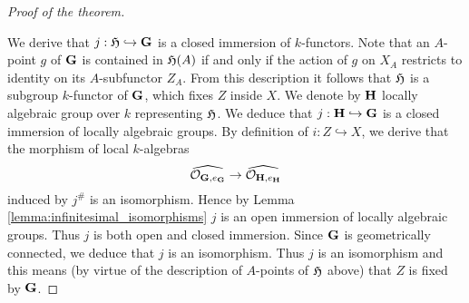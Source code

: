 \begin{proof}[Proof of the theorem]
\begin{center}
\end{center}
We derive that $j:{\mathfrak H} \hookrightarrow \mathbf{G}$ is a closed immersion of $k$-functors. Note that an $A$-point $g$ of $\mathbf{G}$ is contained in ${\mathfrak H}(A)$ if and only if the action of $g$ on $X_A$ restricts to identity on its $A$-subfunctor $Z_A$. From this description it follows that ${\mathfrak H}$ is a subgroup $k$-functor of $\mathbf{G}$, which fixes $Z$ inside $X$. We denote by $\mathbf{H}$ locally algebraic group over $k$ representing ${\mathfrak H}$. We deduce that $j:\mathbf{H}\hookrightarrow \mathbf{G}$ is a closed immersion of locally algebraic groups. By definition of $i:Z\hookrightarrow X$, we derive that the morphism of local $k$-algebras
$$\widehat{{\mathcal O}_{\mathbf{G},e_{\mathbf{G}}}} \rightarrow  \widehat{{\mathcal O}_{\mathbf{H},e_{\mathbf{H}}}}$$
induced by $j^{\#}$ is an isomorphism. Hence by Lemma \ref{lemma:infinitesimal_isomorphisms} $j$ is an open immersion of locally algebraic groups. Thus $j$ is both open and closed immersion. Since $\mathbf{G}$ is geometrically connected, we deduce that $j$ is an isomorphism. Thus $j$ is an isomorphism and this means (by virtue of the description of $A$-points of ${\mathfrak H}$ above) that $Z$ is fixed by $\mathbf{G}$.
\end{proof}
























